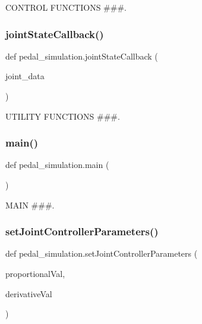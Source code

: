 C\+O\+N\+T\+R\+OL F\+U\+N\+C\+T\+I\+O\+NS \#\#\#. 

\mbox{\label{namespacepedal__simulation_a9410b0fd1bb79787c8581efa83364a49}} 
\subsubsection{\texorpdfstring{jointStateCallback()}{jointStateCallback()}}
{\footnotesize\ttfamily def pedal\+\_\+simulation.\+joint\+State\+Callback (\begin{DoxyParamCaption}\item[{}]{joint\+\_\+data }\end{DoxyParamCaption})}



U\+T\+I\+L\+I\+TY F\+U\+N\+C\+T\+I\+O\+NS \#\#\#. 

\mbox{\label{namespacepedal__simulation_a727e35b81726e63028964cefc65d48c5}} 
\subsubsection{\texorpdfstring{main()}{main()}}
{\footnotesize\ttfamily def pedal\+\_\+simulation.\+main (\begin{DoxyParamCaption}{ }\end{DoxyParamCaption})}



M\+A\+IN \#\#\#. 

\mbox{\label{namespacepedal__simulation_a5a971c07811066312d34f83f16eb4d99}} 
\subsubsection{\texorpdfstring{setJointControllerParameters()}{setJointControllerParameters()}}
{\footnotesize\ttfamily def pedal\+\_\+simulation.\+set\+Joint\+Controller\+Parameters (\begin{DoxyParamCaption}\item[{}]{proportional\+Val,  }\item[{}]{derivative\+Val }\end{DoxyParamCaption})}

